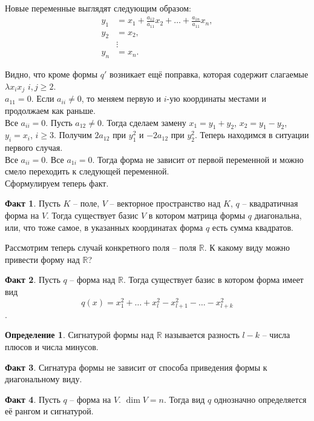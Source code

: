 \documentclass[10pt,a4paper,oneside]{book}
\theoremstyle{definition}
\newtheorem{defn}{Определение}
\newtheorem*{fact}{Факт}
\newcommand{\mb}[1]{\mathbb{#1}}
\def\dfn{\begin{defn}}
\def\edfn{\end{defn}}
\def\fct{\begin{fact}}
\def\efct{\end{fact}}
\begin{document}
Новые переменные выглядят следующим образом:
\begin{align*}
y_1&=x_1+\frac{a_{12}}{a_{11}}x_2 + \dots +\frac{a_{1n}}{a_{11}}x_n,\\
 y_2&=x_2, \\
&\vdots\\
 y_n&=x_n.
\end{align*}

Видно, что кроме формы $q'$ возникает ещё поправка, которая содержит слагаемые $\lambda x_ix_j$ $i,j\geq 2$.\\




 $a_{11}=0$. Если $a_{ii}\neq 0$, то меняем первую и $i$-ую координаты местами  и продолжаем как раньше. \\


 Все $a_{ii}=0$.
Пусть $a_{12}\neq 0$. Тогда сделаем замену $x_1=y_1+y_2$, $x_2=y_1-y_2$, $y_i=x_i$, $i\geq 3$. Получим $2a_{12}$ при $y_1^2$ и $-2a_{12}$ при $y_2^2$. Теперь находимся в ситуации первого случая.\\


 Все $a_{ii}=0$. Все $a_{1i}=0$. Тогда форма не зависит от первой переменной и можно смело переходить к следующей переменной.\\ 



Сформулируем теперь факт.

\fct Пусть $K$ -- поле, $V$ -- векторное пространство над $K$, $q$ -- квадратичная форма на $V$. Тогда существует базис $V$ в котором матрица формы $q$ диагональна, или, что тоже самое, в указанных координатах форма $q$ есть сумма квадратов. 
\efct


Рассмотрим теперь случай конкретного поля -- поля $\mb R$. К какому виду можно привести форму над $\mb R$? 

\fct Пусть $q$ -- форма над $\mb R$. Тогда существует базис в котором форма имеет вид $$q(x)= x_1^2+\dots + x_l^2 - x_{l+1}^2-\dots-x_{l+k}^2 $$.
\efct

\dfn Сигнатурой формы над $\mb R$ называется разность $l-k$ -- числа плюсов и числа минусов.
\edfn

\fct Сигнатура формы не зависит от способа приведения формы к диагональному виду. 
\efct

\fct Пусть $q$ -- форма на $V$. $\dim V =n $. Тогда вид $q$ однозначно определяется её рангом и сигнатурой. 
\efct
\end{document}
